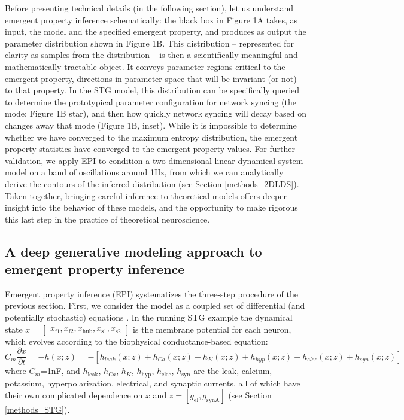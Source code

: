 \documentclass[11pt]{article}
\begin{document}
Before presenting technical details (in the following section), let us understand emergent property inference schematically:  the black box in Figure 1A takes, as input, the model and the specified emergent property, and produces as output the parameter distribution shown in Figure 1B.  
This distribution -- represented for clarity as samples from the distribution -- is then a scientifically meaningful and mathematically tractable object.  
It conveys parameter regions critical to the emergent property, directions in parameter space that will be invariant (or not) to that property.  
In the STG model, this distribution can be specifically queried to determine the prototypical parameter configuration for network syncing (the mode; Figure 1B star), and then how quickly network syncing will decay based on changes away that mode (Figure 1B, inset).  
While it is impossible to determine whether we have converged to the maximum entropy distribution, the emergent property statistics have converged to the emergent property values.  
For further validation, we apply EPI to condition a two-dimensional linear dynamical system model on a band of oscillations around 1Hz, from which we can analytically derive the contours of the inferred distribution (see Section \ref{methods_2DLDS}).
Taken together, bringing careful inference to theoretical models offers deeper insight into the behavior of these models, and the opportunity to make rigorous this last step in the practice of theoretical neuroscience.

\subsection{A deep generative modeling approach to emergent property inference} \label{results_dgm}

Emergent property inference (EPI) systematizes the three-step procedure of the previous section.
First, we consider the model as a coupled set of differential (and potentially stochastic) equations \cite{gutierrez2013multiple}.  In the running STG example the dynamical state $x = \begin{bmatrix} x_{\text{f1}}, x_{\text{f2}}, x_{\text{hub}}, x_{\text{s1}}, x_{\text{s2}} \end{bmatrix}$ is the membrane potential for each neuron, which evolves according to the biophysical conductance-based equation:
\begin{equation} C_m \frac{\partial x}{\partial t} = -h(x; z) = - \left[ h_{leak}(x; z) + h_{Ca}(x; z) + h_K(x; z) + h_{hyp}(x; z) + h_{elec}(x; z) + h_{syn}(x; z)\right] 
\end{equation} 
where $C_m$=1nF, and $h_{\text{leak}}$, $h_{Ca}$, $h_K$, $h_{\text{hyp}}$, $h_{\text{elec}}$, $h_{\text{syn}}$ are the leak, calcium, potassium, hyperpolarization, electrical, and synaptic currents, all of which have their own complicated dependence on $x$ and $z = [g_{\text{el}}, g_{\text{synA}}]$ (see Section \ref{methods_STG}).
\end{document}
